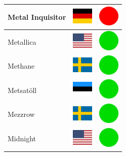 \documentclass[12pt, a4paper, twoside]{report}
\begin{document}
\begin{center}
\begin{longtable}{|p{5cm}|p{2cm}|p{2cm}|}
 Metal Inquisitor                                           & \includegraphics[width=1cm]{../img/flags/de} &   \includegraphics[width=1cm]{../likes/n} \\ \hline
 Metallica                                                  & \includegraphics[width=1cm]{../img/flags/us} &   \includegraphics[width=1cm]{../likes/y} \\ \hline
 Methane                                                    & \includegraphics[width=1cm]{../img/flags/se} &   \includegraphics[width=1cm]{../likes/y} \\ \hline
 Metsatöll                                                  & \includegraphics[width=1cm]{../img/flags/ee} &   \includegraphics[width=1cm]{../likes/y} \\ \hline
 Mezzrow                                                    & \includegraphics[width=1cm]{../img/flags/se} &   \includegraphics[width=1cm]{../likes/y} \\ \hline
 Midnight                                                   & \includegraphics[width=1cm]{../img/flags/us} &   \includegraphics[width=1cm]{../likes/y} \\ \hline

\end{longtable}
\end{center}
\end{document}
